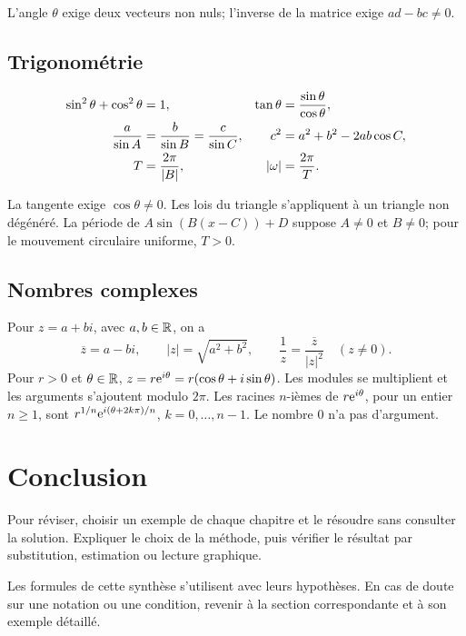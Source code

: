 L'angle \(\theta\) exige deux vecteurs non nuls; l'inverse de la matrice exige \(ad-bc\ne0\).

\section*{Trigonométrie}
\begin{align*}
\sin^2\theta+\cos^2\theta&=1,
&\tan\theta&=\frac{\sin\theta}{\cos\theta},\\
\frac{a}{\sin A}&=\frac{b}{\sin B}=\frac{c}{\sin C},
&c^2&=a^2+b^2-2ab\cos C,\\
T&=\frac{2\pi}{\left\lvert B\right\rvert},
&|\omega|&=\frac{2\pi}{T}.
\end{align*}

La tangente exige \(\cos\theta\ne0\). Les lois du triangle s'appliquent à un triangle non dégénéré. La période de \(A\sin(B(x-C))+D\) suppose \(A\ne0\) et \(B\ne0\); pour le mouvement circulaire uniforme, \(T>0\).

\section*{Nombres complexes}
Pour $z=a+bi$, avec $a,b\in\mathbb{R}$, on a
\[
\overline z=a-bi,\qquad |z|=\sqrt{a^2+b^2},\qquad
\frac1z=\frac{\overline z}{|z|^2}\quad(z\ne0).
\]
Pour $r>0$ et $\theta\in\mathbb{R}$, $z=r\mathrm{e}^{i\theta}=r(\cos\theta+i\sin\theta)$.
Les modules se multiplient et les arguments s'ajoutent modulo $2\pi$.
Les racines $n$-ièmes de $r\mathrm{e}^{i\theta}$, pour un entier $n\ge1$, sont
$r^{1/n}\mathrm{e}^{i(\theta+2k\pi)/n}$, $k=0,\ldots,n-1$. Le nombre $0$ n'a pas d'argument.

\chapter*{Conclusion}
Pour réviser, choisir un exemple de chaque chapitre et le résoudre sans consulter la solution. Expliquer le choix de la méthode, puis vérifier le résultat par substitution, estimation ou lecture graphique.

Les formules de cette synthèse s'utilisent avec leurs hypothèses. En cas de doute sur une notation ou une condition, revenir à la section correspondante et à son exemple détaillé.
